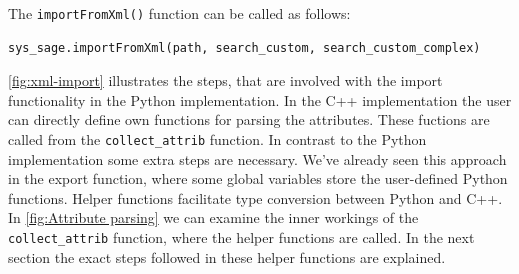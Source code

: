 The \verb|importFromXml()| function can be called as follows:

\begin{lstlisting}[language=Python, xleftmargin=4em, frame = single]
sys_sage.importFromXml(path, search_custom, search_custom_complex)
\end{lstlisting}


\autoref{fig:xml-import} illustrates the steps, that are involved with the import functionality in the Python implementation. In the C++ implementation the user can directly define own functions for parsing the attributes. These fuctions are called from the \verb|collect_attrib| function. In contrast to the Python implementation some extra steps are necessary.
We've already seen this approach in the export function,  where some global variables store the user-defined Python functions. Helper functions facilitate type conversion between Python and C++. In \autoref{fig:Attribute parsing} we can examine the inner workings of the \verb|collect_attrib| function, where the helper functions are called. In the next section the exact steps followed in these helper functions are explained.

